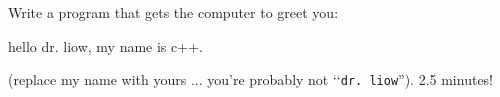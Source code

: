 Write a program that gets the computer to greet you:
\begin{console}
hello dr. liow, my name is c++.
\end{console}
(replace my name with yours ...  you're probably not 
\lq\lq\verb!dr. liow!'').
2.5 minutes!
